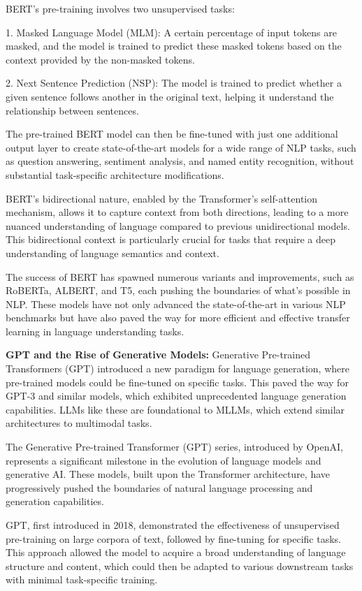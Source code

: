 BERT's pre-training involves two unsupervised tasks:

1. Masked Language Model (MLM): A certain percentage of input tokens are masked, and the model is trained to predict these masked tokens based on the context provided by the non-masked tokens.

2. Next Sentence Prediction (NSP): The model is trained to predict whether a given sentence follows another in the original text, helping it understand the relationship between sentences.

The pre-trained BERT model can then be fine-tuned with just one additional output layer to create state-of-the-art models for a wide range of NLP tasks, such as question answering, sentiment analysis, and named entity recognition, without substantial task-specific architecture modifications.

BERT's bidirectional nature, enabled by the Transformer's self-attention mechanism, allows it to capture context from both directions, leading to a more nuanced understanding of language compared to previous unidirectional models. This bidirectional context is particularly crucial for tasks that require a deep understanding of language semantics and context.

The success of BERT has spawned numerous variants and improvements, such as RoBERTa, ALBERT, and T5, each pushing the boundaries of what's possible in NLP. These models have not only advanced the state-of-the-art in various NLP benchmarks but have also paved the way for more efficient and effective transfer learning in language understanding tasks.


\textbf{GPT and the Rise of Generative Models:} Generative Pre-trained Transformers (GPT) introduced a new paradigm for language generation, where pre-trained models could be fine-tuned on specific tasks. This paved the way for GPT-3 and similar models, which exhibited unprecedented language generation capabilities. LLMs like these are foundational to MLLMs, which extend similar architectures to multimodal tasks.

The Generative Pre-trained Transformer (GPT) series, introduced by OpenAI, represents a significant milestone in the evolution of language models and generative AI. These models, built upon the Transformer architecture, have progressively pushed the boundaries of natural language processing and generation capabilities.

GPT, first introduced in 2018, demonstrated the effectiveness of unsupervised pre-training on large corpora of text, followed by fine-tuning for specific tasks. This approach allowed the model to acquire a broad understanding of language structure and content, which could then be adapted to various downstream tasks with minimal task-specific training.

